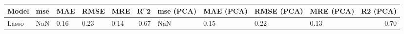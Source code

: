 \begin{table}
\centering
\label{table:iri_reg_pred}
\begin{tabular}{lllllrllllr}
\toprule
\textbf{Model} & \textbf{mse} & \textbf{MAE} & \textbf{RMSE} & \textbf{MRE} & $\textbf{R^2}$ & \textbf{mse (PCA)} & \textbf{MAE (PCA)} & \textbf{RMSE (PCA)} & \textbf{MRE (PCA)} & \textbf{R2 (PCA)} \\
\midrule
         Lasso &          NaN &         0.16 &          0.23 &         0.14 &           0.67 &                NaN &               0.15 &                0.22 &               0.13 &              0.70 \\
\bottomrule
\end{tabular}
\end{table}
